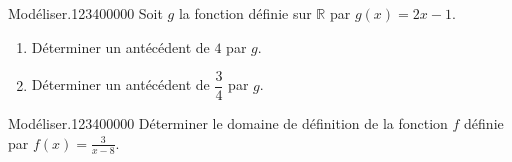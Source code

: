 \begin{pageAD}
\begin{ExoCad}{Modéliser.}{1234}{0}{0}{0}{0}{0}
Soit $g$ la fonction définie sur $\mathbb R$ par $g(x)=2x-1$. 

\begin{enumerate}
\item Déterminer un antécédent de $4$ par $g$.  

\item Déterminer un antécédent de $\dfrac{3}{4}$ par $g$.  

\end{enumerate}
\end{ExoCad}


\begin{ExoCad}{Modéliser.}{1234}{0}{0}{0}{0}{0}
Déterminer le domaine de définition de la fonction $f$ définie par $f(x)=\frac{3}{x-8}$. 
\end{ExoCad}
 
\end{pageAD} %


